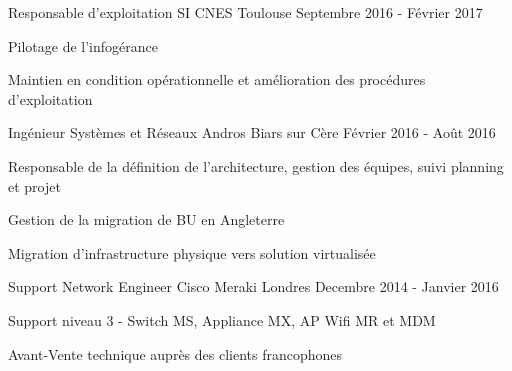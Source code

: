 \begin{cventries}
  \cventry
    {Responsable d'exploitation SI} %
    {CNES} %
    {Toulouse} %
    {Septembre 2016 - Février 2017} %
    {
      \begin{cvitems} %
        \item {Pilotage de l'infogérance}
        \item {Maintien en condition opérationnelle et amélioration des procédures d'exploitation}
      \end{cvitems}
    }
    
  \cventry
  {Ingénieur Systèmes et Réseaux} %
  {Andros} %
  {Biars sur Cère} %
  {Février 2016 - Août 2016} %
  {
    \begin{cvitems} %
      \item {Responsable de la définition de l'architecture, gestion des équipes, suivi planning et projet}
      \item {Gestion de la migration de BU en Angleterre}
      \item {Migration d'infrastructure physique vers solution virtualisée}
    \end{cvitems}
}

  \cventry
    {Support Network Engineer} %
    {Cisco Meraki} %
    {Londres} %
    {Decembre 2014 - Janvier 2016} %
    {
      \begin{cvdoubleitems} %
        \item {Support niveau 3 - Switch MS, Appliance MX, AP Wifi MR et MDM}
        \item {Avant-Vente technique auprès des clients francophones}
      \end{cvdoubleitems}
    }

\end{cventries}
